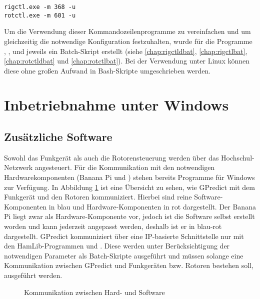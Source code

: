 \vspace{-1em}
\begin{shaded}
	\texttt{rigctl.exe -m 368 -u}\\
	\texttt{rotctl.exe -m 601 -u}
\end{shaded}
\vspace{-1em}

Um die Verwendung dieser Kommandozeilenprogramme zu vereinfachen und um gleichzeitig die notwendige Konfiguration festzuhalten, wurde für die Programme , ,  und  jeweils ein Batch-Skript erstellt (siehe \ref{chap:rigctldbat}, \ref{chap:rigctlbat}, \ref{chap:rotctldbat} und \ref{chap:rotctlbat}). Bei der Verwendung unter Linux können diese ohne großen Aufwand in Bash-Skripte umgeschrieben werden. 

\section{Inbetriebnahme unter Windows}

\subsection{Zusätzliche Software}
\label{chap:software}

Sowohl das Funkgerät als auch die Rotorensteuerung werden über das Hochschul-Netzwerk angesteuert. Für die Kommunikation mit den notwendigen Hardwarekomponenten (Banana Pi und ) stehen bereits Programme für Windows zur Verfügung. In Abbildung \ref{fig:swhwcom} ist eine Übersicht zu sehen, wie GPredict mit dem Funkgerät und den Rotoren kommuniziert. Hierbei sind reine Software-Komponenten in blau und Hardware-Komponenten in rot dargestellt. Der Banana Pi liegt zwar als Hardware-Komponente vor, jedoch ist die Software selbst erstellt worden und kann jederzeit angepasst werden, deshalb ist er in blau-rot dargestellt.\newpar
GPredict kommuniziert über eine IP-basierte Schnittstelle nur mit den HamLib-Programmen  und . Diese werden unter Berücksichtigung der notwendigen Parameter als Batch-Skripte ausgeführt und müssen solange eine Kommunikation zwischen GPredict und Funkgeräten bzw. Rotoren bestehen soll, ausgeführt werden.

\newpage

\begin{figure}[h]
	\centering
	
	\caption{Kommunikation zwischen Hard- und Software}
	\label{fig:swhwcom} 
\end{figure}

